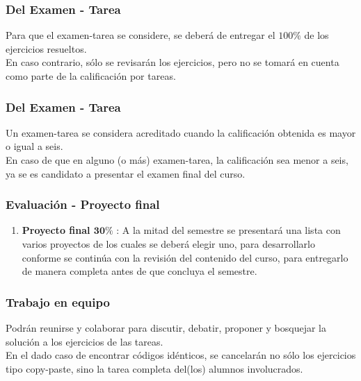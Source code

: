 \documentclass[12pt]{beamer}
\begin{document}
\begin{frame}
\frametitle{Del Examen - Tarea}
Para que el examen-tarea se considere, se deberá de entregar el $100\%$ de los ejercicios resueltos.
\\
\bigskip
\pause
En caso contrario, sólo se revisarán los ejercicios, pero no se tomará en cuenta como parte de la calificación por tareas.
\end{frame}
\begin{frame}
\frametitle{Del Examen - Tarea}
Un examen-tarea se considera acreditado cuando la calificación obtenida es mayor o igual a seis.
\\
\bigskip
\pause
En caso de que en alguno (o más) examen-tarea, la calificación sea menor a seis, ya se es candidato a presentar el examen final del curso.
\end{frame}
\begin{frame}
\frametitle{Evaluación - Proyecto final}
\begin{enumerate}[<+->]    
\conti
\item \textbf{Proyecto final $\mathbf{30\%}$} : A la mitad del semestre se presentará una lista con varios proyectos de los cuales se deberá elegir uno, para desarrollarlo conforme se continúa con la revisión del contenido del curso, para entregarlo de manera completa antes de que concluya el semestre.
\end{enumerate}
\end{frame}

\begin{frame}
\frametitle{Trabajo en equipo}
Podrán reunirse y colaborar para discutir, debatir, proponer y bosquejar la solución a los ejercicios de las tareas.
\\
\bigskip
En el dado caso de encontrar códigos idénticos, se cancelarán no sólo los ejercicios tipo copy-paste, sino la tarea completa del(los) alumnos involucrados.
\end{frame}
\end{document}
